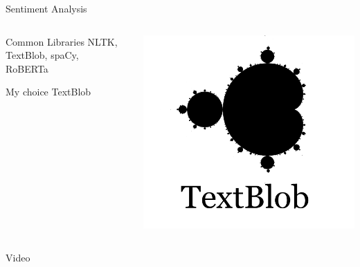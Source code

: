 \documentclass[a4paper]{article}
\begin{document}
	\begin{frame}{Sentiment Analysis}
		 \begin{columns}[T]
			\begin{column}{.5\textwidth}
				\begin{block}{Common Libraries}
					NLTK, TextBlob, spaCy, RoBERTa\
				\end{block}
				\vspace{0.5cm}
				\begin{block}{My choice}
					TextBlob
				\end{block}
			\end{column}
			\begin{column}{.5\textwidth}
					\includegraphics[width=\textwidth]{textblob.png}
			\end{column}
		\end{columns}
		
	\end{frame}
	
	\begin{frame}{Video}
		\centering
	\end{frame}
	
\end{document}
